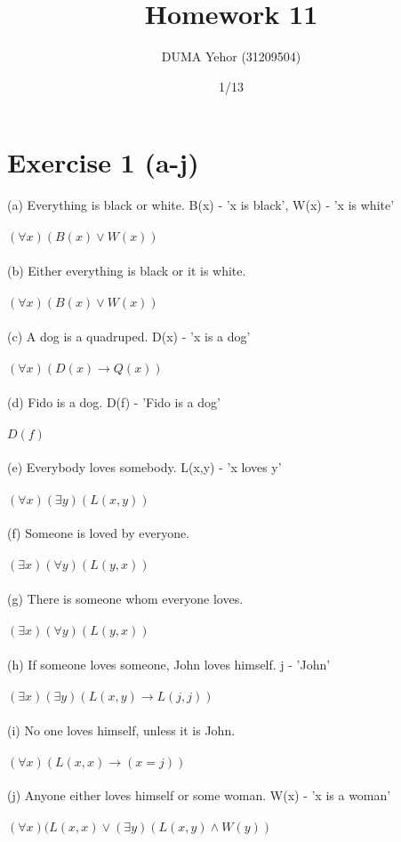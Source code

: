 \documentclass{article}
\title{Homework 11}
\author{DUMA Yehor (31209504)}
\date{1/13}
\begin{document}
\maketitle
\section{Exercise 1 (a-j)}
(a) Everything is black or white. B(x) - 'x is black', W(x) - 'x is white' \\ \\
$(\forall x)(B(x) \vee W(x))$ \\ \\
(b) Either everything is black or it is white.\\ \\
$(\forall x)(B(x) \vee W(x))$ \\ \\
(c) A dog is a quadruped. D(x) - 'x is a dog' \\ \\
$(\forall x) (D(x) \rightarrow Q(x))$ \\ \\
(d) Fido is a dog. D(f) - 'Fido is a dog' \\ \\
$D(f)$ \\\\
(e) Everybody loves somebody. L(x,y) - 'x loves y' \\\\
$(\forall x)(\exists y)(L(x,y))$ \\\\
(f) Someone is loved by everyone. \\\\
$(\exists x)(\forall y)(L(y,x))$ \\\\
(g) There is someone whom everyone loves. \\\\
$(\exists x)(\forall y)(L(y,x))$ \\\\
(h) If someone loves someone, John loves himself. j - 'John' \\\\
$(\exists x)(\exists y)(L(x,y) \rightarrow L(j,j))$ \\\\
(i) No one loves himself, unless it is John. \\\\
$(\forall x)(L(x,x) \rightarrow (x=j))$ \\\\
(j) Anyone either loves himself or some woman. W(x) - 'x is a woman' \\\\
$(\forall x)(L(x,x) \vee (\exists y)(L(x,y) \wedge W(y))$
\end{document}
